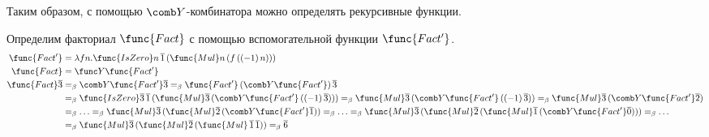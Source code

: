 Таким образом, с помощью $\comb Y$-комбинатора можно определять рекурсивные функции.
\begin{example} Определим факториал $\func{Fact}$ с помощью вспомогательной функции $\func{Fact'}$.
\begin{align*}
    \func{Fact'} &= \lambda{} f n . \func{IsZero} n \mathinner{\overline{1}}
                    (\func{Mul} n \mathinner{(f \mathinner{(\mathinner{(-1)} n))}}) \\
    \func{Fact} &= \func Y \func{Fact'} \\
    \func{Fact} \overline 3 &=_\beta \comb Y \func{Fact'} \overline 3 =_\beta \func{Fact'} \mathinner{(\comb Y \func{Fact'})} \overline 3
                \\&=_\beta \func{IsZero} \overline 3 \mathinner{\overline{1}}
                    (\func{Mul} \overline 3 \mathinner{(\comb Y \func{Fact'} \mathinner{(\mathinner{(-1)} \overline 3)})})
                =_\beta \func{Mul} \overline 3 \mathinner{(\comb Y \func{Fact'} \mathinner{(\mathinner{(-1)} \overline 3)})}
                =_\beta \func{Mul} \overline 3 \mathinner{(\comb Y \func{Fact'} \overline 2)} \\&=_\beta \ldots
                =_\beta \func{Mul} \overline 3 \mathinner{(\func{Mul} \overline 2 \mathinner{(\comb Y \func{Fact'} \overline 1)})}
                =_\beta \ldots =_\beta \func{Mul} \overline 3 \mathinner{(\func{Mul} \overline 2 \mathinner{(
                    \func{Mul} \overline 1 \mathinner{(\comb Y \func{Fact'} \overline 0)})})} =_\beta \ldots \\
                &=_\beta \func{Mul} \overline 3 \mathinner{(\func{Mul} \overline 2 \mathinner{(
                    \func{Mul} \mathinner{\overline 1} \overline 1)})}
                =_\beta \overline 6
\end{align*}
\end{example}
